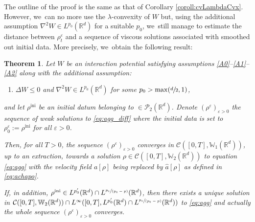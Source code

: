 \documentclass[JEP,XML,SOM,Unicode, NoFloatCountersInSection,published]{cedram}
\newcommand{\spfrac}[2]{\sfrac{#1}{(#2)}}
\newcommand{\ini}{\mathrm{ini}}
\def\RR{\mathbb{R}}
\def\WW{\mathbb{W}}
\def\eps{\varepsilon}
\def\calC{{\mathcal C}}
\def\calP{{\mathcal P}}
\def\achapo{\widehat{a}}
\theoremstyle{plain}
\newtheorem{theorem}{Theorem}[section]
\theoremstyle{definition}
\begin{document}
The outline of the proof is the same as that of Corollary \ref{coroll:cvLambdaCvx}. However, we~can no more use the $\lambda$-convexity of $W$ but, using the additional assumption $\nabla^2 W \in L^{p_0}(\RR^d)$ for a suitable $p_0$, we~still manage to estimate the distance between $\rho_t^\eps$ and a sequence of viscous solutions associated with smoothed out initial data. More precisely, we~obtain the following result:
\begin{theorem}\label{thm:cvRepulsive}
Let $W$ be an interaction potential satisfying assumptions \eqref{A0}--\eqref{A1}--\eqref{A2} along with the additional assumption:
\begin{enumerate}\renewcommand{\theenumi}{\textup{A}\arabic{enumi}}\setcounter{enumi}{4}
\item
\label{A5} $\Delta W \leq 0$ and $\nabla^2 W \in L^{p_0}(\RR^d)$ for some $p_0 > \max(\sfrac d2, 1)$,
\end{enumerate}
and let $\rho^{\ini}$ be an initial datum belonging to $ \in \calP_2(\RR^d)$.
Denote $(\rho^\eps)_{\eps > 0}$ the sequence of weak solutions to \eqref{eq:agg_diff} where the initial data is set to $\rho_0^\eps := \rho^{\ini}$ for all $\eps > 0$.

Then, for all $T>0$, the sequence $(\rho^\eps)_{\eps > 0}$ converges in $\calC([0,T], \WW_1(\RR^d))$, up to an extraction, towards a solution $\rho \in \calC([0,T], \WW _2(\RR^d))$ to equation \eqref{eq:agg} with the velocity field $a[\rho]$ being replaced by $\achapo[\rho]$ as defined in \eqref{eq:achapo}.

If, in addition, $\rho^{\ini} \in L^{p_0'}(\RR^d) \cap L^{\spfrac{p_0}{p_0-p}}(\RR^d)$, then there exists a unique solution in $\calC([0,T], \WW_2(\RR^d)) \cap L^\infty([0,T], L^{p_0'}(\RR^d) \cap L^{\spfrac{p_0}{p_0-p}}(\RR^d))$ to \eqref{eq:agg} and actually the whole sequence $(\rho^\eps)_{\eps > 0}$ converges.
\end{theorem}
\end{document}
